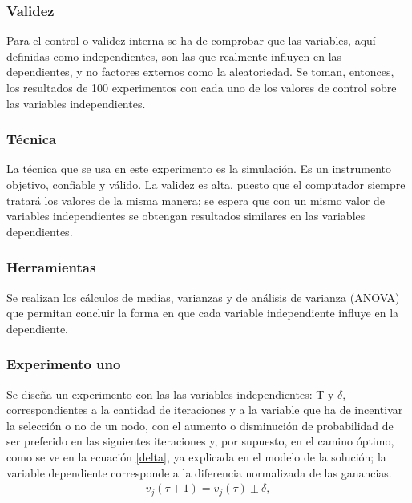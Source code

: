\subsubsection{Validez}
Para el control o validez interna se ha de comprobar que las variables, aquí definidas como independientes, son las que realmente influyen en las dependientes, y no factores externos como la aleatoriedad. Se toman, entonces, los resultados de 100 experimentos con cada uno de los valores de control sobre las variables independientes.

\subsubsection{Técnica}
La técnica que se usa en este experimento es la simulación. Es un instrumento objetivo, confiable y válido. La validez es alta, puesto que el computador siempre tratará los valores de la misma manera; se espera que con un mismo valor de variables independientes se obtengan resultados similares en las variables dependientes.

\subsubsection{Herramientas}
Se realizan los cálculos de medias, varianzas y de análisis de varianza (ANOVA) que permitan concluir la forma en que cada variable independiente influye en la dependiente.

\subsubsection{Experimento uno}

Se diseña un experimento con las las variables independientes: T y $\delta$, correspondientes a la cantidad de iteraciones y a la variable que ha de incentivar la selección o no de un nodo, con el aumento o disminución de probabilidad de ser preferido en las siguientes iteraciones y, por supuesto, en el camino óptimo, como se ve en la ecuación \ref{delta}, ya explicada en el modelo de la solución; la variable dependiente corresponde a la diferencia normalizada de las ganancias.
\begin{eqnarray}\label{delta}
v_j(\tau + 1) = v_j(\tau) \pm \delta,
\end{eqnarray}


